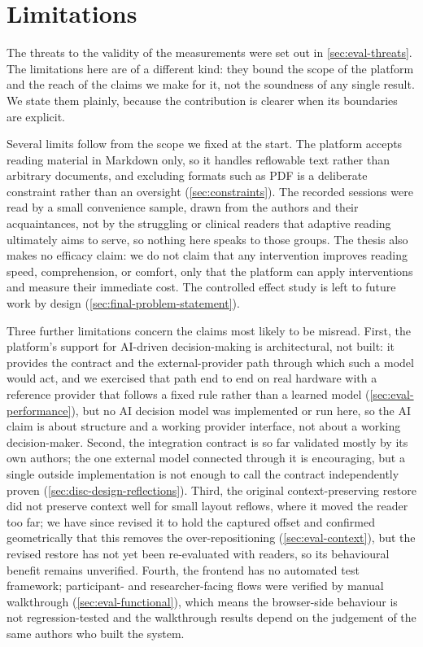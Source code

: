 \section{Limitations}
\label{sec:disc-limitations}

The threats to the validity of the measurements were set out in \cref{sec:eval-threats}.
The limitations here are of a different kind: they bound the scope of the platform and the reach of the claims we make for it, not the soundness of any single result.
We state them plainly, because the contribution is clearer when its boundaries are explicit.

Several limits follow from the scope we fixed at the start.
The platform accepts reading material in Markdown only, so it handles reflowable text rather than arbitrary documents, and excluding formats such as PDF is a deliberate constraint rather than an oversight (\cref{sec:constraints}).
The recorded sessions were read by a small convenience sample, drawn from the authors and their acquaintances, not by the struggling or clinical readers that adaptive reading ultimately aims to serve, so nothing here speaks to those groups.
The thesis also makes no efficacy claim: we do not claim that any intervention improves reading speed, comprehension, or comfort, only that the platform can apply interventions and measure their immediate cost.
The controlled effect study is left to future work by design (\cref{sec:final-problem-statement}).

Three further limitations concern the claims most likely to be misread.
First, the platform's support for AI-driven decision-making is architectural, not built: it provides the contract and the external-provider path through which such a model would act, and we exercised that path end to end on real hardware with a reference provider that follows a fixed rule rather than a learned model (\cref{sec:eval-performance}), but no AI decision model was implemented or run here, so the AI claim is about structure and a working provider interface, not about a working decision-maker.
Second, the integration contract is so far validated mostly by its own authors; the one external model connected through it is encouraging, but a single outside implementation is not enough to call the contract independently proven (\cref{sec:disc-design-reflections}).
Third, the original context-preserving restore did not preserve context well for small layout reflows, where it moved the reader too far; we have since revised it to hold the captured offset and confirmed geometrically that this removes the over-repositioning (\cref{sec:eval-context}), but the revised restore has not yet been re-evaluated with readers, so its behavioural benefit remains unverified.
Fourth, the frontend has no automated test framework; participant- and researcher-facing flows were verified by manual walkthrough (\cref{sec:eval-functional}), which means the browser-side behaviour is not regression-tested and the walkthrough results depend on the judgement of the same authors who built the system.
